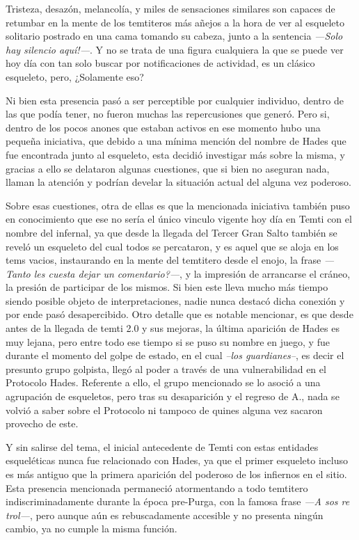 \documentclass[
  spanish,
]{book}
\begin{document}
Tristeza, desazón, melancolía, y miles de sensaciones similares son capaces de retumbar en la mente de los temtiteros más añejos a la hora de ver al esqueleto solitario postrado en una cama tomando su cabeza, junto a la sentencia \emph{---Solo hay silencio aquí!---}. Y no se trata de una figura cualquiera la que se puede ver hoy día con tan solo buscar por notificaciones de actividad, es un clásico esqueleto, pero, ¿Solamente eso?

Ni bien esta presencia pasó a ser perceptible por cualquier individuo, dentro de las que podía tener, no fueron muchas las repercusiones que generó. Pero si, dentro de los pocos anones que estaban activos en ese momento hubo una pequeña iniciativa, que debido a una mínima mención del nombre de Hades que fue encontrada junto al esqueleto, esta decidió investigar más sobre la misma, y gracias a ello se delataron algunas cuestiones, que si bien no aseguran nada, llaman la atención y podrían develar la situación actual del alguna vez poderoso.

Sobre esas cuestiones, otra de ellas es que la mencionada iniciativa también puso en conocimiento que ese no sería el único vinculo vigente hoy día en Temti con el nombre del infernal, ya que desde la llegada del Tercer Gran Salto también se reveló un esqueleto del cual todos se percataron, y es aquel que se aloja en los tems vacios, instaurando en la mente del temtitero desde el enojo, la frase \emph{---Tanto les cuesta dejar un comentario?---}, y la impresión de arrancarse el cráneo, la presión de participar de los mismos. Si bien este lleva mucho más tiempo siendo posible objeto de interpretaciones, nadie nunca destacó dicha conexión y por ende pasó desapercibido.
Otro detalle que es notable mencionar, es que desde antes de la llegada de temti 2.0 y sus mejoras, la última aparición de Hades es muy lejana, pero entre todo ese tiempo si se puso su nombre en juego, y fue durante el momento del golpe de estado, en el cual \emph{--los guardianes--}, es decir el presunto grupo golpista, llegó al poder a través de una vulnerabilidad en el Protocolo Hades. Referente a ello, el grupo mencionado se lo asoció a una agrupación de esqueletos, pero tras su desaparición y el regreso de A., nada se volvió a saber sobre el Protocolo ni tampoco de quines alguna vez sacaron provecho de este.

Y sin salirse del tema, el inicial antecedente de Temti con estas entidades esqueléticas nunca fue relacionado con Hades, ya que el primer esqueleto incluso es más antiguo que la primera aparición del poderoso de los infiernos en el sitio. Esta presencia mencionada permaneció atormentando a todo temtitero indiscriminadamente durante la época pre-Purga, con la famosa frase \emph{---A sos re trol---}, pero aunque aún es rebuscadamente accesible y no presenta ningún cambio, ya no cumple la misma función.
\end{document}

